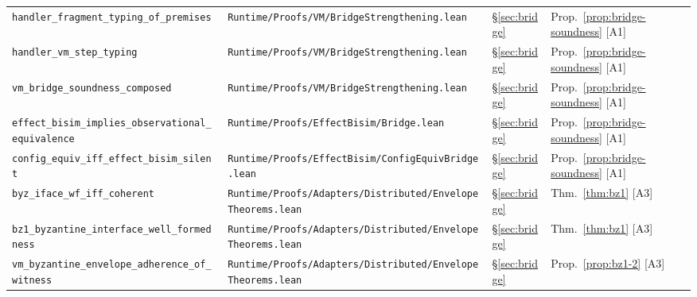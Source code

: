 \documentclass[a4paper,10pt,twocolumn,english]{article}
\numberwithin{equation}{section}
\theoremstyle{paperdef}
\theoremstyle{paperplain}
\theoremstyle{paperdef}
\theoremstyle{paperremark}
\begin{document}
\begin{table}[H]
\begin{tabularx}{\textwidth}{L{0.27\textwidth}L{0.37\textwidth}L{0.06\textwidth}>{\raggedright\arraybackslash}X}
		\texttt{handler\_fragment\_typing\_\allowbreak of\_premises}              & \texttt{Runtime/\allowbreak Proofs/\allowbreak VM/\allowbreak}\mbox{\texttt{BridgeStrengthening.lean}}                            & \S\ref{sec:bridge}       & Prop.~\ref{prop:bridge-soundness} [A1]     \\
		\texttt{handler\_vm\_step\_typing}                                        & \texttt{Runtime/\allowbreak Proofs/\allowbreak VM/\allowbreak}\mbox{\texttt{BridgeStrengthening.lean}}                            & \S\ref{sec:bridge}       & Prop.~\ref{prop:bridge-soundness} [A1]     \\
		\texttt{vm\_bridge\_soundness\_\allowbreak composed}                      & \texttt{Runtime/\allowbreak Proofs/\allowbreak VM/\allowbreak}\mbox{\texttt{BridgeStrengthening.lean}}                            & \S\ref{sec:bridge}       & Prop.~\ref{prop:bridge-soundness} [A1]     \\
		\texttt{effect\_bisim\_implies\_\allowbreak observational\_equivalence}   & \texttt{Runtime/\allowbreak Proofs/\allowbreak EffectBisim/\allowbreak}\mbox{\texttt{Bridge.lean}}                                & \S\ref{sec:bridge}       & Prop.~\ref{prop:bridge-soundness} [A1]     \\
		\texttt{config\_equiv\_iff\_\allowbreak effect\_bisim\_silent}            & \texttt{Runtime/\allowbreak Proofs/\allowbreak EffectBisim/\allowbreak}\mbox{\texttt{ConfigEquivBridge.lean}}                     & \S\ref{sec:bridge}       & Prop.~\ref{prop:bridge-soundness} [A1]     \\
		\texttt{byz\_iface\_wf\_iff\_\allowbreak coherent}                        & \texttt{Runtime/\allowbreak Proofs/\allowbreak Adapters/\allowbreak Distributed/\allowbreak}\mbox{\texttt{EnvelopeTheorems.lean}} & \S\ref{sec:bridge}       & Thm.~\ref{thm:bz1} [A3]                    \\
		\texttt{bz1\_byzantine\_interface\_\allowbreak well\_formedness}          & \texttt{Runtime/\allowbreak Proofs/\allowbreak Adapters/\allowbreak Distributed/\allowbreak}\mbox{\texttt{EnvelopeTheorems.lean}} & \S\ref{sec:bridge}       & Thm.~\ref{thm:bz1} [A3]                    \\
		\texttt{vm\_byzantine\_envelope\_\allowbreak adherence\_of\_witness}      & \texttt{Runtime/\allowbreak Proofs/\allowbreak Adapters/\allowbreak Distributed/\allowbreak}\mbox{\texttt{EnvelopeTheorems.lean}} & \S\ref{sec:bridge}       & Prop.~\ref{prop:bz1-2} [A3]                \\

\end{tabularx}
\end{table}
\end{document}
